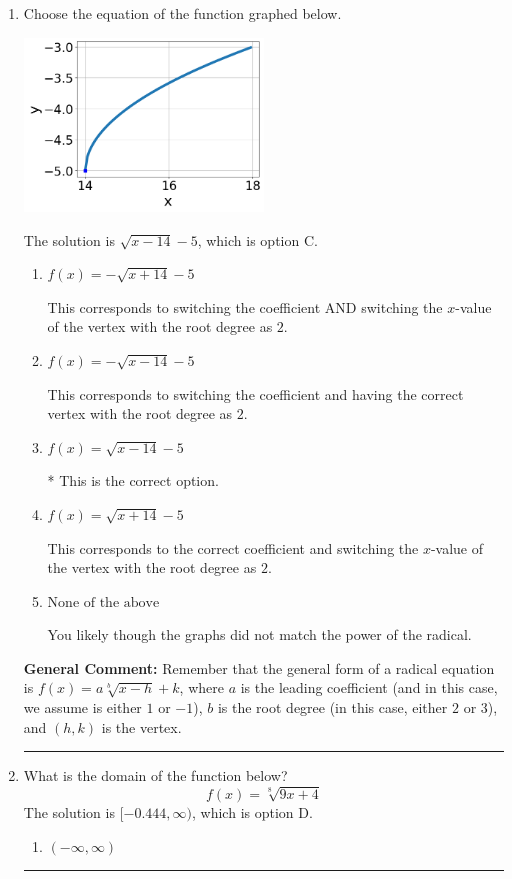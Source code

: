 \documentclass{extbook}[14pt]
\newcommand{\litem}[1]{\item #1

\rule{\textwidth}{0.4pt}}
\begin{document}
\begin{enumerate}\litem{
Choose the equation of the function graphed below.

\begin{center}
    \includegraphics[width=0.5\textwidth]{../Figures/radicalGraphToEquationCopyA.png}
\end{center}


The solution is \( \sqrt{x - 14} - 5 \), which is option C.\begin{enumerate}[label=\Alph*.]
\item \( f(x) = - \sqrt{x + 14} - 5 \)

This corresponds to switching the coefficient AND switching the $x$-value of the vertex with the root degree as $2$.
\item \( f(x) = - \sqrt{x - 14} - 5 \)

This corresponds to switching the coefficient and having the correct vertex with the root degree as $2$.
\item \( f(x) = \sqrt{x - 14} - 5 \)

* This is the correct option.
\item \( f(x) = \sqrt{x + 14} - 5 \)

This corresponds to the correct coefficient and switching the $x$-value of the vertex with the root degree as $2$.
\item \( \text{None of the above} \)

You likely though the graphs did not match the power of the radical.
\end{enumerate}

\textbf{General Comment:} Remember that the general form of a radical equation is $ f(x) = a \sqrt[b]{x - h} + k$, where $a$ is the leading coefficient (and in this case, we assume is either $1$ or $-1$), $b$ is the root degree (in this case, either $2$ or $3$), and $(h, k)$ is the vertex.
}
\litem{
What is the domain of the function below?
\[ f(x) = \sqrt[8]{9 x + 4} \]The solution is \( [-0.444, \infty) \), which is option D.\begin{enumerate}[label=\Alph*.]
\item \( (-\infty, \infty) \)


\end{enumerate}}
\end{enumerate}
\end{document}

